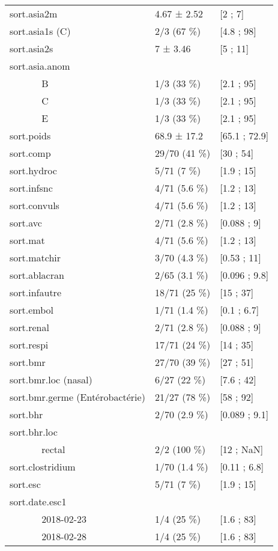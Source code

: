 \documentclass[]{article}
\begin{document}
\begin{longtable}{lll}
  sort.asia2m & 4.67 ± 2.52 & [2 ; 7] \\ 
  sort.asia1s (C) & 2/3 (67 \%) &  [4.8 ; 98] \\ 
  sort.asia2s & 7 ± 3.46 & [5 ; 11] \\ 
  sort.asia.anom &   &   \\ 
  ~~~~~~ B & 1/3 (33 \%) &  [2.1 ; 95] \\ 
  ~~~~~~ C & 1/3 (33 \%) &  [2.1 ; 95] \\ 
  ~~~~~~ E & 1/3 (33 \%) &  [2.1 ; 95] \\ 
  sort.poids & 68.9 ± 17.2 & [65.1 ; 72.9] \\ 
  sort.comp & 29/70 (41 \%) &  [30 ; 54] \\ 
  sort.hydroc & 5/71 (7 \%) &  [1.9 ; 15] \\ 
  sort.infsnc & 4/71 (5.6 \%) &  [1.2 ; 13] \\ 
  sort.convuls & 4/71 (5.6 \%) &  [1.2 ; 13] \\ 
  sort.avc & 2/71 (2.8 \%) &  [0.088 ; 9] \\ 
  sort.mat & 4/71 (5.6 \%) &  [1.2 ; 13] \\ 
  sort.matchir & 3/70 (4.3 \%) &  [0.53 ; 11] \\ 
  sort.ablacran & 2/65 (3.1 \%) &  [0.096 ; 9.8] \\ 
  sort.infautre & 18/71 (25 \%) &  [15 ; 37] \\ 
  sort.embol & 1/71 (1.4 \%) &  [0.1 ; 6.7] \\ 
  sort.renal & 2/71 (2.8 \%) &  [0.088 ; 9] \\ 
  sort.respi & 17/71 (24 \%) &  [14 ; 35] \\ 
  sort.bmr & 27/70 (39 \%) &  [27 ; 51] \\ 
  sort.bmr.loc (nasal) & 6/27 (22 \%) &  [7.6 ; 42] \\ 
  sort.bmr.germe (Entérobactérie) & 21/27 (78 \%) &  [58 ; 92] \\ 
  sort.bhr & 2/70 (2.9 \%) &  [0.089 ; 9.1] \\ 
  sort.bhr.loc &   &   \\ 
  ~~~~~~ rectal & 2/2 (100 \%) &  [12 ; NaN] \\ 
  sort.clostridium & 1/70 (1.4 \%) &  [0.11 ; 6.8] \\ 
  sort.esc & 5/71 (7 \%) &  [1.9 ; 15] \\ 
  sort.date.esc1 &   &   \\ 
  ~~~~~~ 2018-02-23 & 1/4 (25 \%) &  [1.6 ; 83] \\ 
  ~~~~~~ 2018-02-28 & 1/4 (25 \%) &  [1.6 ; 83] \\ 

\end{longtable}
\end{document}
